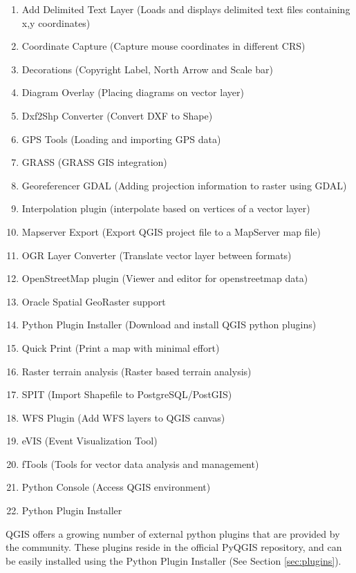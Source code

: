 
\begin{enumerate}
\item Add Delimited Text Layer (Loads and displays delimited text files
containing x,y coordinates)
\item Coordinate Capture (Capture mouse coordinates in different CRS)
\item Decorations (Copyright Label, North Arrow and Scale bar)
\item Diagram Overlay (Placing diagrams on vector layer)
\item Dxf2Shp Converter (Convert DXF to Shape)
\item GPS Tools (Loading and importing GPS data)
\item GRASS (GRASS GIS integration)
\item Georeferencer GDAL (Adding projection information to raster using GDAL)
\item Interpolation plugin (interpolate based on vertices of a vector layer)
\item Mapserver Export (Export QGIS project file to a MapServer map file)
\item OGR Layer Converter (Translate vector layer between formats)
\item OpenStreetMap plugin (Viewer and editor for openstreetmap data)
\item Oracle Spatial GeoRaster support
\item Python Plugin Installer (Download and install QGIS python plugins)
\item Quick Print (Print a map with minimal effort)
\item Raster terrain analysis (Raster based terrain analysis)
\item SPIT (Import Shapefile to PostgreSQL/PostGIS)
\item WFS Plugin (Add WFS layers to QGIS canvas)
\item eVIS (Event Visualization Tool)
\item fTools (Tools for vector data analysis and management)
\item Python Console (Access QGIS environment)
\item Python Plugin Installer
\end{enumerate}


QGIS offers a growing number of external python plugins that are provided by
the community. These plugins reside in the official PyQGIS repository, and
can be easily installed using the Python Plugin Installer (See Section
\ref{sec:plugins}).

